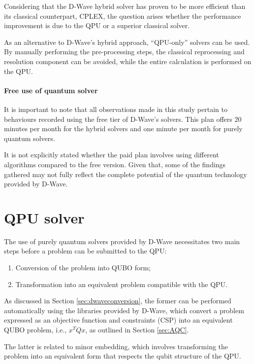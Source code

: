 Considering that the D-Wave hybrid solver has proven to be more efficient than its classical counterpart, CPLEX, the question arises whether the performance improvement is due to the QPU or a superior classical solver.

As an alternative to D-Wave's hybrid approach, ``QPU-only'' solvers can be used. By manually performing the pre-processing steps, the classical reprocessing and resolution component can be avoided, while the entire calculation is performed on the QPU.

\paragraph{Free use of quantum solver} It is important to note that all observations made in this study pertain to behaviours recorded using the free tier of D-Wave's solvers. 
This plan offers 20 minutes per month for the hybrid solvers and one minute per month for purely quantum solvers.

It is not explicitly stated whether the paid plan involves using different algorithms compared to the free version. 
Given that, some of the findings gathered may not fully reflect the complete potential of the quantum technology provided by D-Wave.

\section{QPU solver}

The use of purely quantum solvers provided by D-Wave necessitates two main steps before a problem can be submitted to the QPU:

\begin{enumerate}
    \item Conversion of the problem into QUBO form;
    \item Transformation into an equivalent problem compatible with the QPU.
\end{enumerate}

As discussed in Section \ref{sec:dwaveconversion}, the former can be performed automatically using the libraries provided by D-Wave, which convert a problem expressed as an objective function and constraints (CSP) into an equivalent QUBO problem, i.e., $x^TQx$, as outlined in Section \ref{sec:AQC}.

The latter is related to minor embedding, which involves transforming the problem into an equivalent form that respects the qubit structure of the QPU.

